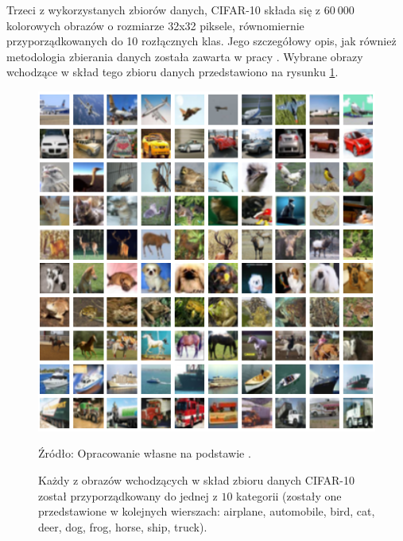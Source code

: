 \documentclass[12pt,a4paper,twoside]{article}
\newcommand{\source}[1]{\caption*{\hfill Źródło: {#1}} }
\begin{document}
Trzeci z wykorzystanych zbiorów danych, CIFAR-10 składa się z $60~000$ kolorowych obrazów o rozmiarze 32x32 piksele, równomiernie przyporządkowanych do 10 rozłącznych klas. Jego szczegółowy opis, jak również metodologia zbierania danych została zawarta w pracy \citet{krizhevsky2009}. Wybrane obrazy wchodzące w skład tego zbioru danych przedstawiono na rysunku \ref{fig:cifar_data}.
\begin{figure}[h]
  \centering
\includegraphics[scale=0.9]{../obrazy/fig:cifar_data.png}
\caption{Każdy z obrazów wchodzących w skład zbioru danych CIFAR-10 został przyporządkowany do jednej z $10$ kategorii (zostały one przedstawione w kolejnych wierszach: airplane, automobile, bird, cat, deer, dog, frog, horse, ship, truck).\label{fig:cifar_data}}
\source{Opracowanie własne na podstawie \citet{krizhevsky2009}.}
\end{figure}
\end{document}
